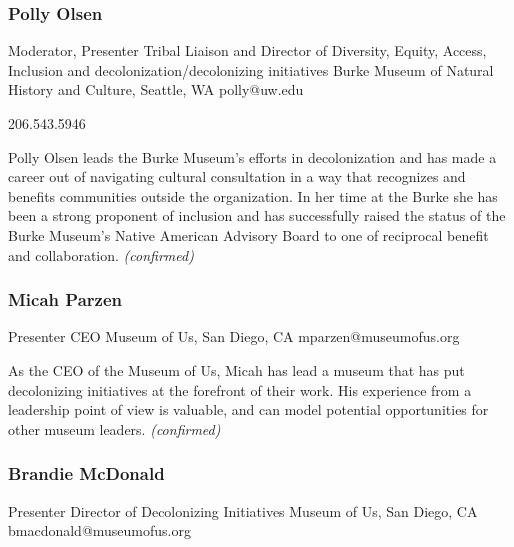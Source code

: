 \documentclass{report}
\begin{document}
              
                \subsubsection*{ Polly Olsen }
                Moderator, Presenter\newline
                Tribal Liaison and Director of Diversity, Equity, Access, Inclusion and decolonization/decolonizing initiatives\newline
                Burke Museum of Natural History and Culture, Seattle, WA
                \newline
                polly@uw.edu\newline
                
                206.543.5946\newline

                Polly Olsen leads the Burke Museum’s efforts in decolonization and has made a career out of navigating cultural consultation in a way that recognizes and benefits communities outside the organization. In her time at the Burke she has been a strong proponent of inclusion and has successfully raised the status of the Burke Museum’s Native American Advisory Board to one of reciprocal benefit and collaboration.\newline
                \emph{ (confirmed) }
              

              
                \subsubsection*{ Micah Parzen }
                Presenter\newline
                CEO\newline
                Museum of Us, San Diego, CA
                \newline
                mparzen@museumofus.org\newline
                
                

                As the CEO of the Museum of Us, Micah has lead a museum that has put decolonizing initiatives at the forefront of their work. His experience from a leadership point of view is valuable, and can model potential opportunities for other museum leaders.
                \emph{ (confirmed) }
              

              
                \subsubsection*{ Brandie McDonald }
                Presenter\newline
                Director of Decolonizing Initiatives\newline
                Museum of Us, San Diego, CA
                \newline
                bmacdonald@museumofus.org\newline
                
\end{document}
